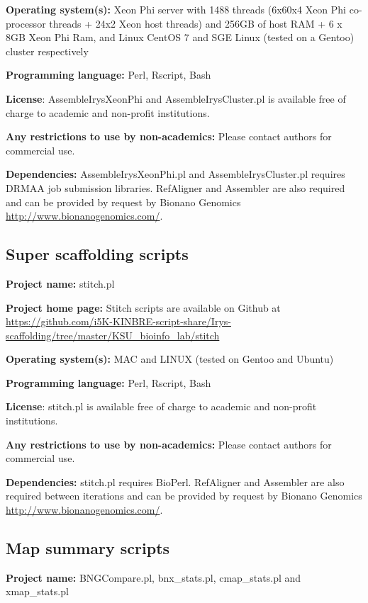 \documentclass{bmcart}
\begin{document}
\textbf{Operating system(s):} Xeon Phi server with 1488 threads (6x60x4 Xeon Phi co-processor threads + 24x2 Xeon host threads) and 256GB of host RAM + 6 x 8GB Xeon Phi Ram, and Linux CentOS 7 and SGE Linux (tested on a Gentoo) cluster respectively

\textbf{Programming language:} Perl, Rscript, Bash

\textbf{License}: AssembleIrysXeonPhi and AssembleIrysCluster.pl is available free of charge to academic and non-profit institutions.

\textbf{Any restrictions to use by non-academics:} Please contact authors for commercial use.

\textbf{Dependencies:} AssembleIrysXeonPhi.pl and AssembleIrysCluster.pl requires DRMAA job submission libraries. RefAligner and Assembler are also required and can be provided by request by Bionano Genomics \url{http://www.bionanogenomics.com/}.

\subsection*{\textbf{Super scaffolding scripts}}

\textbf{Project name:} stitch.pl

\textbf{Project home page:} Stitch scripts are available on Github at \url{https://github.com/i5K-KINBRE-script-share/Irys-scaffolding/tree/master/KSU\_bioinfo\_lab/stitch}

\textbf{Operating system(s):} MAC and LINUX (tested on Gentoo and Ubuntu)

\textbf{Programming language:} Perl, Rscript, Bash

\textbf{License}: stitch.pl is available free of charge to academic and non-profit institutions.

\textbf{Any restrictions to use by non-academics:} Please contact authors for commercial use.

\textbf{Dependencies:} stitch.pl requires BioPerl. RefAligner and Assembler are also required between iterations and can be provided by request by Bionano Genomics \url{http://www.bionanogenomics.com/}.

\subsection*{\textbf{Map summary scripts}}

\textbf{Project name:} BNGCompare.pl, bnx\_stats.pl, cmap\_stats.pl and xmap\_stats.pl
\end{document}
